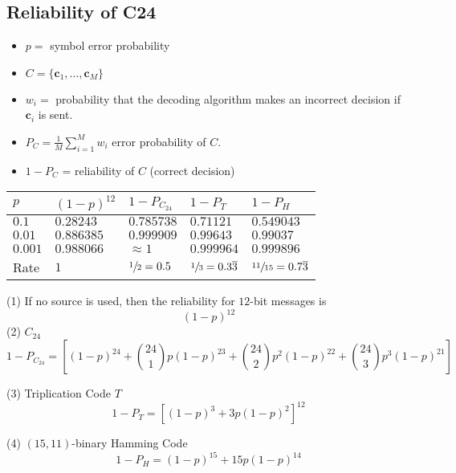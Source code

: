 \subsection{Reliability of C24}
\begin{itemize}
    \item $ p = $ symbol error probability
    \item $ C=\{\bm{c}_1,\ldots ,\bm{c}_M\} $
    \item $ w_i = $ probability that the decoding algorithm makes an incorrect
          decision if $ \bm{c}_i $ is sent.
    \item $ P_C=\frac{1}{M} \sum\limits_{i=1}^{M} w_i $ error probability of $ C $.
    \item $ 1-P_C $ = reliability of $ C $ (correct decision)
\end{itemize}

\begin{table}[H]
    \centering
    \begin{tabularx}{\linewidth}{@{}YYYYY@{}}
        $ p $     & $ (1-p)^{12} $ & $ 1-P_{C_{24}} $     & $ 1-P_T $                        & $ 1-P_H $                          \\
        \midrule
        $ 0.1 $   & $ 0.28243 $    & $ 0.785738      $    & $ 0.71121      $                 & $ 0.549043       $                 \\
        $ 0.01 $  & $ 0.886385 $   & $ 0.999909      $    & $ 0.99643      $                 & $ 0.99037       $                  \\
        $ 0.001 $ & $ 0.988066 $   & $ \approx 1    $     & $ 0.999964     $                 & $ 0.999896        $                \\
        Rate      & $ 1        $   & $ \sfrac{1}{2}=0.5 $ & $ \sfrac{1}{3}=0.3\overline{3} $ & $ \sfrac{11}{15}= 0.7\overline{3}$ \\
    \end{tabularx}
\end{table}


(1) If no source is used, then the reliability for $ 12 $-bit messages is
\[ (1-p)^{12} \]
(2) $ C_{24} $
\[ 1-P_{C_{24}}=\left[ (1-p)^{24}+\binom{24}{1}p(1-p)^{23}+\binom{24}{2}p^2(1-p)^{22}
        + \binom{24}{3}p^3 (1-p)^{21} \right] \]

(3) Triplication Code $ T $
\[ 1-P_T=\left[ (1-p)^3+3p(1-p)^2 \right]^{12} \]

(4) $ (15,11) $-binary Hamming Code
\[ 1-P_H=(1-p)^{15}+15p(1-p)^{14} \]
